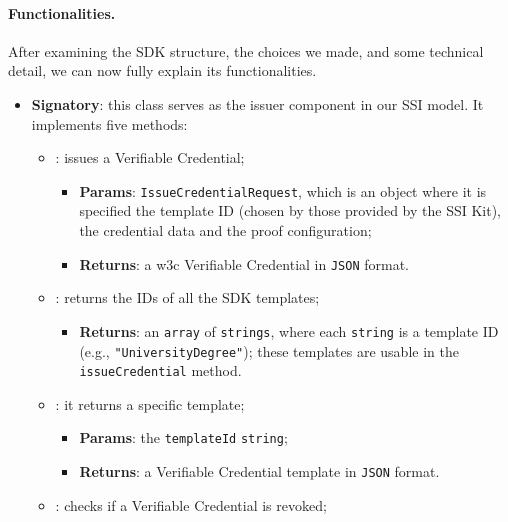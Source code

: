 \paragraph{Functionalities.}
After examining the SDK structure, the choices we made, and some technical detail, we can now 
fully explain its functionalities.
\begin{itemize}
    \setlength{\itemsep}{1cm}

    \item \textbf{Signatory}: this class serves as the issuer component in our
    SSI model. It implements five methods:
    \begin{itemize}
        \setlength{\itemsep}{0.4cm}
        \item[] : issues a Verifiable Credential;
        \begin{itemize}
            \item \textbf{Params}: \texttt{IssueCredentialRequest}, which is an object where 
            it is specified the template ID (chosen by those provided by the SSI Kit), the
            credential data and the proof configuration;
            \item \textbf{Returns}: a \acrshort{w3c} Verifiable Credential in \texttt{JSON} format.
        \end{itemize}
        \item[] : returns the IDs of all the SDK templates;
        \begin{itemize}
            \item \textbf{Returns}: an \texttt{array} of \texttt{strings}, where each \texttt{string} is a template ID
            (e.g., \texttt{"UniversityDegree"}); these templates are usable in the
            \texttt{issueCredential} method.
        \end{itemize}
        \item[] : it returns a specific template;
        \begin{itemize}
            \item \textbf{Params}: the \texttt{templateId} \texttt{string};
            \item \textbf{Returns}: a Verifiable Credential template in \texttt{JSON} format.
        \end{itemize}
        \item[] : checks if a Verifiable Credential is revoked;
        \label{method:isRevoked}
        \begin{itemize}

\end{itemize}
\end{itemize}
\end{itemize}
